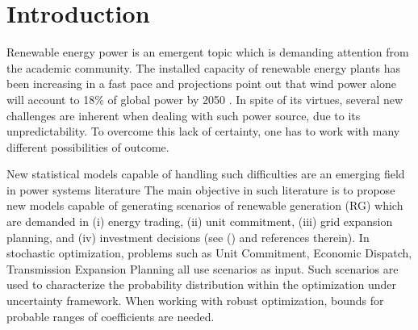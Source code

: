 \section{Introduction}


Renewable energy power is an emergent topic which is demanding attention from the academic community. %
The installed capacity of renewable energy plants has been increasing in a fast pace and projections point out that wind power alone will account to 18\% of global power by 2050  \cite{IntEnerAgency}.
In spite of its virtues, several new challenges are inherent when dealing with such power source, due to its unpredictability. To overcome this lack of certainty, one has to work with many different possibilities of outcome.

New statistical models capable of handling such difficulties are an emerging field in power systems literature \cite{zhang_review_2014 , bessa2012time, gallego2016line,moller_time-adaptive_2008,nielsen2006,bremnes_probabilistic_2004,wan_direct_2017} 
The main objective in such literature is to propose new models capable of generating scenarios of renewable generation (RG) which are demanded in (i) energy trading, (ii) unit commitment, (iii) grid expansion planning, and (iv) investment decisions (see (\cite{moreiraStreet,jabr2013robust,zhaoguan,Aderson2017}) and references therein). 
In stochastic optimization, problems such as Unit Commitment, Economic Dispatch, Transmission Expansion Planning all use scenarios as input. 
Such scenarios are used to characterize the probability distribution within the optimization under uncertainty framework.
When working with robust optimization, bounds for probable ranges of coefficients are needed.

 
